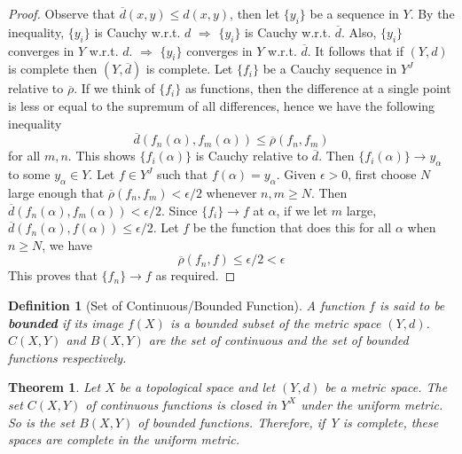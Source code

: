 \documentclass[article,11pt, reqno]{article}
\newtheorem*{theorem}{Theorem}
\newtheorem*{definition}{Definition}
\theoremstyle{remark}
\newcommand{\Ra}{\Rightarrow}
\newcommand{\ra}{\rightarrow}
\newcommand{\<}{\langle}
\renewcommand{\>}{\rangle}
\begin{document}
\begin{proof}
    Observe that $\overline{d}(x,y)\leq d(x,y)$, then let $\{y_i\}$ be a sequence in $Y$. By the inequality, $\{y_i\}$ is Cauchy w.r.t. $d$ $\Ra$ $\{y_i\}$ is Cauchy w.r.t. $\overline{d}$. Also, $\{y_i\}$ converges in $Y$ w.r.t. $d$. $\Ra$ $\{y_i\}$ converges in $Y$ w.r.t. $\overline{d}$. It follows that if $(Y, d)$ is complete then $(Y, \overline{d})$ is complete. Let $\{f_i\}$ be a Cauchy sequence in $Y^J$ relative to $\overline{\rho}$. If we think of $\{f_i\}$ as functions, then the difference at a single point is less or equal to the supremum of all differences, hence we have the following inequality
    $$
        \overline{d}(f_n(\alpha),f_m(\alpha))\leq\overline{\rho}(f_n,f_m)
    $$
    for all $m,n$. This shows $\{f_{i}(\alpha)\}$ is Cauchy relative to $\overline{d}$. Then $\{f_i(\alpha)\}\ra y_{\alpha}$ to some $y_{\alpha}\in Y$. Let $f\in Y^J$ such that $f(\alpha)=y_{\alpha}$. Given $\epsilon > 0$, first choose $N$ large enough that $\overline{\rho}(f_n, f_m) < \epsilon/2$ whenever $n, m\geq N$. Then $\overline{d}(f_n(\alpha),f_m(\alpha))<\epsilon/2$. Since $\{f_i\}\ra f$ at $\alpha$, if we let $m$ large, $\overline{d}(f_n(\alpha),f(\alpha))\leq\epsilon/2$. Let $f$ be the function that does this for all $\alpha$ when $n\geq N$, we have 
    $$
        \overline{\rho}(f_n,f)\leq\epsilon/2<\epsilon
    $$
    This proves that $\{f_n\}\ra f$ as required.
\end{proof}
\begin{definition}[Set of Continuous/Bounded Function]
    A function $f$ is said to be \textbf{bounded} if its image $f(X)$ is a bounded subset of the metric space $(Y, d)$. $C(X,Y)$ and $B(X,Y)$ are the set of continuous and the set of bounded functions respectively.
\end{definition}
\begin{theorem}
    Let $X$ be a topological space and let $(Y, d)$ be a metric space. The set $C(X, Y )$ of continuous functions is closed in $Y^X$ under the uniform metric. So is the set $B(X, Y )$ of bounded functions. Therefore, if Y is complete, these spaces are complete in the uniform metric.
\end{theorem}
\end{document}
